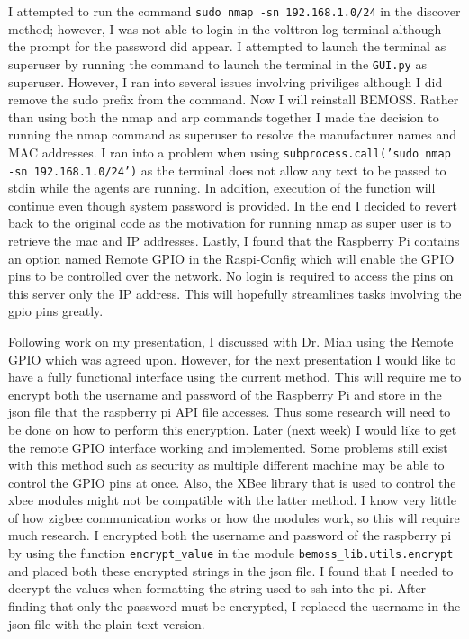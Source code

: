 \documentclass[fontsize=11pt, %
                             paper=letter, %
                             twoside, %
                             captions=tableheading,
                             index=totoc,
                             hyperref]{labbook}
\begin{document}
\begin{addmargin}[0cm]{0cm}
I attempted to run the command \texttt{sudo nmap -sn 192.168.1.0/24} in the discover method; however, I was not able to login in the volttron log terminal although the prompt for the password did appear. I attempted to launch the terminal as superuser by running the command to launch the terminal in the \texttt{GUI.py} as superuser. However, I ran into several issues involving priviliges although I did remove the sudo prefix from the command. Now I will reinstall BEMOSS.
\bigbreak\noindent
Rather than using both the nmap and arp commands together I made the decision to running the nmap command as superuser to resolve the manufacturer names and MAC addresses. I ran into a problem when using \texttt{subprocess.call('sudo nmap -sn 192.168.1.0/24')} as the terminal does not allow any text to be passed to stdin while the agents are running. In addition, execution of the function will continue even though system password is provided. In the end I decided to revert back to the original code as the motivation for running nmap as super user is to retrieve the mac and IP addresses.
\bigbreak\noindent
Lastly, I found that the Raspberry Pi contains an option named Remote GPIO in the Raspi-Config which will enable the GPIO pins to be controlled over the network. No login is required to access the pins on this server only the IP address. This will hopefully streamlines tasks involving the gpio pins greatly.

Following work on my presentation, I discussed with Dr. Miah using the Remote GPIO which was agreed upon. However, for the next presentation I would like to have a fully functional interface using the current method. This will require me to encrypt both the username and password of the Raspberry Pi and store in the json file that the raspberry pi API file accesses. Thus some research will need to be done on how to perform this encryption. Later (next week) I would like to get the remote GPIO interface working and implemented. Some problems still exist with this method such as security as multiple different machine may be able to control the GPIO pins at once. Also, the XBee library that is used to control the xbee modules might not be compatible with the latter method. I know very little of how zigbee communication works or how the modules work, so this will require much research.
\bigbreak\noindent
I encrypted both the username and password of the raspberry pi by using the function \texttt{encrypt\_value} in the module \texttt{bemoss\_lib.utils.encrypt} and placed both these encrypted strings in the json file. I found that I needed to decrypt the values when formatting the string used to ssh into the pi. After finding that only the password must be encrypted, I replaced the username in the json file with the plain text version.


\end{addmargin}
\end{document}
